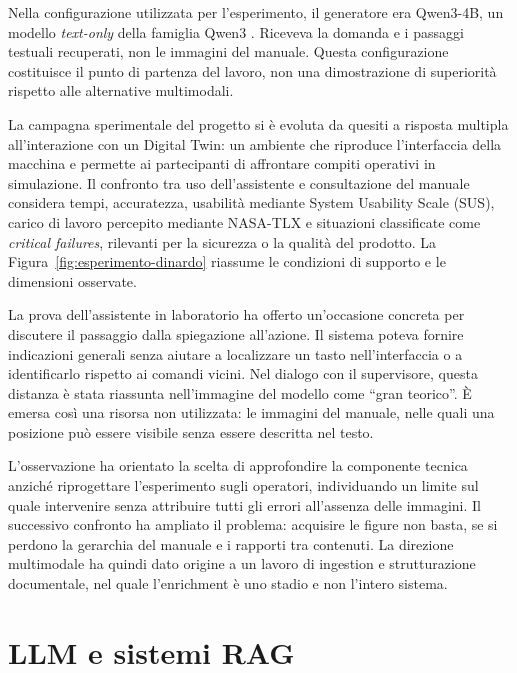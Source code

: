 Nella configurazione utilizzata per l'esperimento, il generatore era Qwen3-4B, un modello \emph{text-only} della famiglia Qwen3 \parencite{qwen2025release}. Riceveva la domanda e i passaggi testuali recuperati, non le immagini del manuale. Questa configurazione costituisce il punto di partenza del lavoro, non una dimostrazione di superiorità rispetto alle alternative multimodali.

La campagna sperimentale del progetto si è evoluta da quesiti a risposta multipla all'interazione con un Digital Twin: un ambiente che riproduce l'interfaccia della macchina e permette ai partecipanti di affrontare compiti operativi in simulazione. Il confronto tra uso dell'assistente e consultazione del manuale considera tempi, accuratezza, usabilità mediante System Usability Scale (SUS), carico di lavoro percepito mediante NASA-TLX e situazioni classificate come \emph{critical failures}, rilevanti per la sicurezza o la qualità del prodotto. La Figura~\ref{fig:esperimento-dinardo} riassume le condizioni di supporto e le dimensioni osservate.



La prova dell'assistente in laboratorio ha offerto un'occasione concreta per discutere il passaggio dalla spiegazione all'azione. Il sistema poteva fornire indicazioni generali senza aiutare a localizzare un tasto nell'interfaccia o a identificarlo rispetto ai comandi vicini. Nel dialogo con il supervisore, questa distanza è stata riassunta nell'immagine del modello come \enquote{gran teorico}. È emersa così una risorsa non utilizzata: le immagini del manuale, nelle quali una posizione può essere visibile senza essere descritta nel testo.

L'osservazione ha orientato la scelta di approfondire la componente tecnica anziché riprogettare l'esperimento sugli operatori, individuando un limite sul quale intervenire senza attribuire tutti gli errori all'assenza delle immagini. Il successivo confronto ha ampliato il problema: acquisire le figure non basta, se si perdono la gerarchia del manuale e i rapporti tra contenuti. La direzione multimodale ha quindi dato origine a un lavoro di ingestion e strutturazione documentale, nel quale l'enrichment è uno stadio e non l'intero sistema.

\section{LLM e sistemi RAG}
\label{sec:llm-rag}

